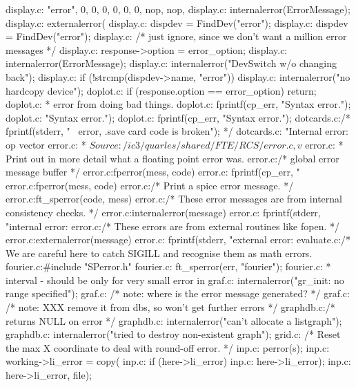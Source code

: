display.c:    {"error", 0, 0, 0, 0, 0, 0, nop, nop,
display.c:    internalerror(ErrorMessage);
display.c:    externalerror(
display.c:    dispdev = FindDev("error");
display.c:      dispdev = FindDev("error");
display.c:        /* just ignore, since we don't want a million error messages */
display.c:        response->option = error_option;
display.c:    internalerror(ErrorMessage);
display.c:        internalerror("DevSwitch w/o changing back");
display.c:      if (!strcmp(dispdev->name, "error")) {
display.c:        internalerror("no hardcopy device");
doplot.c:        if (response.option == error_option) return;
doplot.c:     * error from doing bad things.
doplot.c:                fprintf(cp_err, "Syntax error.\n");
doplot.c:                            "Syntax error.\n");
doplot.c:                fprintf(cp_err, "Syntax error.\n");
dotcards.c:/* fprintf(stderr, "error, .save card code is broken\n"); */
dotcards.c:                "Internal error: op vector %
error.c: *           $Source: /ic3/quarles/shared/FTE/RCS/error.c,v $
error.c: * Print out in more detail what a floating point error was.
error.c:/* global error message buffer */
error.c:fperror(mess, code)
error.c:        fprintf(cp_err, "%
error.c:fperror(mess, code)
error.c:/* Print a spice error message. */
error.c:ft_sperror(code, mess)
error.c:/* These error messages are from internal consistency checks. */
error.c:internalerror(message)
error.c:    fprintf(stderr, "internal error:  %
error.c:/* These errors are from external routines like fopen. */
error.c:externalerror(message)
error.c:    fprintf(stderr, "external error:  %
evaluate.c:/* We are careful here to catch SIGILL and recognise them as math errors.
fourier.c:#include "SPerror.h"
fourier.c:                ft_sperror(err, "fourier");
fourier.c:             * interval - should be only for very small error in
graf.c:      internalerror("gr_init:  no range specified");
graf.c:      /* note: where is the error message generated? */
graf.c:        /* note: XXX remove it from dbs, so won't get further errors */
graphdb.c:/* returns NULL on error */
graphdb.c:      internalerror("can't allocate a listgraph");
graphdb.c:    internalerror("tried to destroy non-existent graph");
grid.c:    /* Reset the max X coordinate to deal with round-off error. */
inp.c:                perror(s);
inp.c:                    working->li_error = copy(
inp.c:                if (here->li_error) {
inp.c:                                here->li_error);
inp.c:                            here->li_error, file);
}}}
